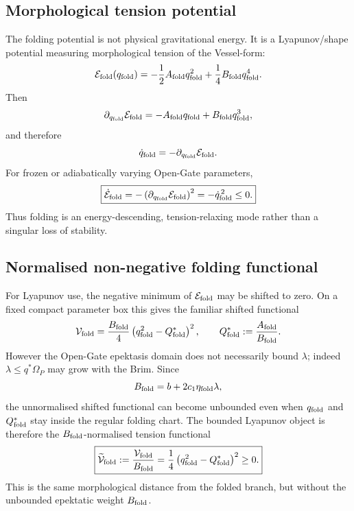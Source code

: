 \documentclass[11pt,a4paper]{article}
\theoremstyle{plain}
\theoremstyle{definition}
\theoremstyle{remark}
\begin{document}
\subsection{Morphological tension potential}
The folding potential is not physical gravitational energy. It is a
Lyapunov/shape potential measuring morphological tension of the Vessel-form:
\begin{equation}
  \mathcal E_{\rm fold}(q_{\rm fold})
  =-\frac12A_{\rm fold}q_{\rm fold}^{2}
  +\frac14B_{\rm fold}q_{\rm fold}^{4}.
\end{equation}
Then
\begin{equation}
  \partial_{q_{\rm fold}}\mathcal E_{\rm fold}
  =-A_{\rm fold}q_{\rm fold}
  +B_{\rm fold}q_{\rm fold}^{3},
\end{equation}
and therefore
\begin{equation}
  \dot q_{\rm fold}
  =-\partial_{q_{\rm fold}}\mathcal E_{\rm fold}.
\end{equation}
For frozen or adiabatically varying Open-Gate parameters,
\begin{equation}
  \boxed{
  \dot{\mathcal E}_{\rm fold}
  =-\left(\partial_{q_{\rm fold}}\mathcal E_{\rm fold}\right)^2
  =-\dot q_{\rm fold}^{\,2}\le0.}
\end{equation}
Thus folding is an energy-descending, tension-relaxing mode rather than a
singular loss of stability.

\subsection{Normalised non-negative folding functional}
For Lyapunov use, the negative minimum of $\mathcal E_{\rm fold}$ may be shifted
to zero. On a fixed compact parameter box this gives the familiar shifted
functional
\begin{equation}
  \mathcal V_{\rm fold}
  =\frac{B_{\rm fold}}{4}
  \left(q_{\rm fold}^{2}-Q_{\rm fold}^{*}\right)^2,
  \qquad
  Q_{\rm fold}^{*}:=\frac{A_{\rm fold}}{B_{\rm fold}}.
\end{equation}
However the Open-Gate epektasis domain does not necessarily bound $\lambda$;
indeed $\lambda\le q^*\Omega_P$ may grow with the Brim. Since
\begin{equation}
  B_{\rm fold}=b+2c_1\eta_{\rm fold}\lambda,
\end{equation}
the unnormalised shifted functional can become unbounded even when
$q_{\rm fold}$ and $Q_{\rm fold}^{*}$ stay inside the regular folding chart. The
bounded Lyapunov object is therefore the $B_{\rm fold}$-normalised tension
functional
\begin{equation}
  \boxed{
  \widetilde{\mathcal V}_{\rm fold}
  :=\frac{\mathcal V_{\rm fold}}{B_{\rm fold}}
  =\frac14\left(q_{\rm fold}^{2}-Q_{\rm fold}^{*}\right)^2\ge0.}
\end{equation}
This is the same morphological distance from the folded branch, but without the
unbounded epektatic weight $B_{\rm fold}$.
\end{document}
